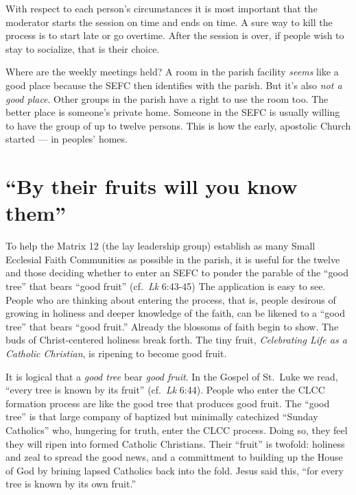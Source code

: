 \documentclass{article}
\begin{document}
With respect to each person's circumstances it is most important that the
moderator starts the session on time and ends on time. A sure way to kill the
process is to start late or go overtime. After the session is over, if people
wish to stay to socialize, that is their choice.

Where are the weekly meetings held? A room in the parish facility \emph{seems}
like a good place because the SEFC then identifies with the parish. But it's
also \emph{not a good place}. Other groups in the parish have a right to use the
room too. The better place is someone's private home. Someone in the SEFC is
usually willing to have the group of up to twelve persons. This is how the
early, apostolic Church started --- in peoples' homes.


\section{``By their fruits will you know them''}

To help the Matrix 12 (the lay leadership group) establish as many Small
Ecclesial Faith Communities as possible in the parish, it is useful for the
twelve and those deciding whether to enter an SEFC to ponder the parable of the
``good tree'' that bears ``good fruit'' (cf.\ \emph{Lk} 6:43-45) The application
is easy to see. People who are thinking about entering the process, that is,
people desirous of growing in holiness and deeper knowledge of the faith, can be
likened to a ``good tree'' that bears ``good fruit.'' Already the blossoms of
faith begin to show. The buds of Christ-centered holiness break forth. The tiny
fruit, \emph{Celebrating Life as a Catholic Christian}, is ripening to become
good fruit.

It is logical that a \emph{good tree} bear \emph{good fruit}. In the Gospel of
St.\ Luke we read, ``every tree is known by its fruit'' (cf.\ \emph{Lk}
6:44). People who enter the CLCC formation process are like the good tree that
produces good fruit. The ``good tree'' is that large company of baptized but
minimally catechized ``Sunday Catholics'' who, hungering for truth, enter the CLCC
process. Doing so, they feel they will ripen into formed Catholic
Christians. Their ``fruit'' is twofold: holiness and zeal to spread the good news,
and a committment to building up the House of God by brining lapsed Catholics
back into the fold. Jesus said this, ``for every tree is known by its own
fruit.''
\end{document}
